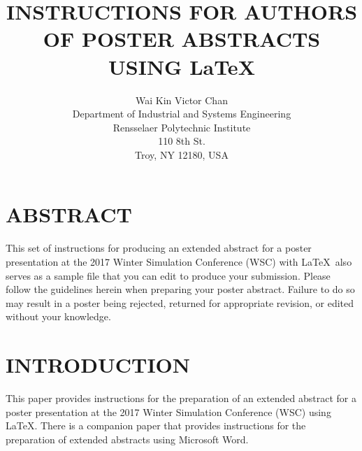 \documentclass{wscposterproc}
\begin{document}
%
%
%

\title{INSTRUCTIONS FOR AUTHORS OF POSTER ABSTRACTS USING \LaTeX}

\author{Wai Kin Victor Chan\\[12pt]
Department of Industrial and Systems Engineering\\
Rensselaer Polytechnic Institute\\
110 8th St.\\
Troy, NY 12180, USA
}

\maketitle


\section*{ABSTRACT}

This set of instructions for producing an extended abstract for a poster presentation at the 2017 Winter Simulation Conference (WSC) with \LaTeX\ also serves as a sample file that you can edit to produce your submission. Please follow the guidelines herein when preparing your poster abstract. Failure to do so may result in a poster being rejected, returned for appropriate revision, or edited without your knowledge.

\section{INTRODUCTION}
This paper provides instructions for the preparation of an extended abstract for a poster presentation at the 2017 Winter Simulation Conference (WSC) using \LaTeX. There is a companion paper that provides instructions for the preparation of extended abstracts using Microsoft Word.
\end{document}
